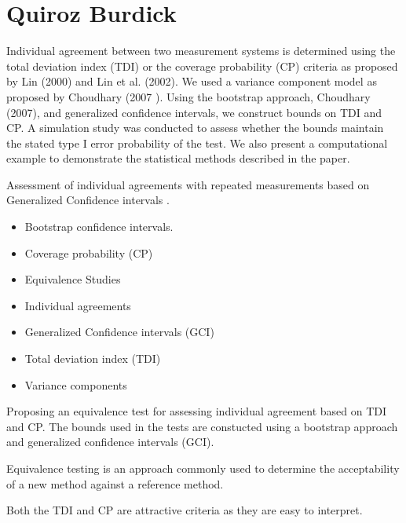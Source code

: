 \documentclass[MAIN.tex]{subfiles}
\begin{document}
\chapter{Quiroz Burdick}

Individual agreement between two measurement systems is determined using the total deviation index (TDI) or the coverage probability (CP) criteria as 
proposed by Lin (2000) and Lin et al. (2002). We used a variance component model as proposed by Choudhary (2007 ). 
Using the bootstrap approach, Choudhary (2007), and generalized confidence intervals, we construct bounds on TDI and CP. 
A simulation study was conducted to assess whether the bounds maintain the stated type I error probability of the test. 
We also present a computational example to demonstrate the statistical methods described in the paper.

\bigskip

Assessment of individual agreements with repeated measurements based on Generalized Confidence intervals \citep{QB}.

\begin{itemize}
	\item Bootstrap confidence intervals.
	\item Coverage probability (CP)
	\item Equivalence Studies
	\item Individual agreements
	\item Generalized Confidence intervals (GCI)
	\item Total deviation index (TDI)
	\item Variance components
\end{itemize}


Proposing an equivalence test for assessing individual agreement based on TDI and CP.
The bounds used in the tests are constucted using a bootstrap approach and generalized confidence intervals (GCI).


Equivalence testing is an approach commonly used to determine the acceptability of a new method 
against a reference method.


Both the TDI and CP are attractive criteria as they are easy to interpret.
\end{document}
